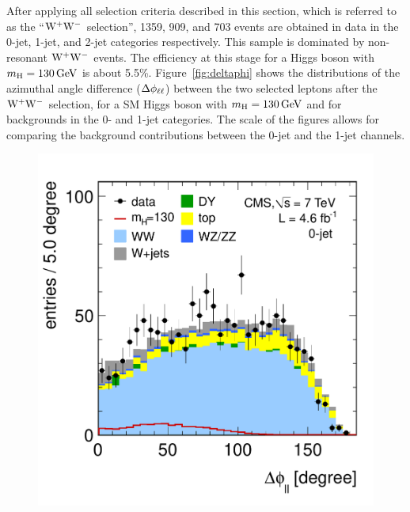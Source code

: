 \documentclass[12pt,twoside,a4paper,cmspaper,final,collab]{cms-tdr}
\begin{document}
After applying all selection criteria described in this section, which is referred to
as the ``$\mathrm{W^+}{}\mathrm{W^-}$ selection'', 1359, 909, and 703 events are obtained in data in the
0-jet, 1-jet, and 2-jet categories respectively. This sample is
dominated by non-resonant $\mathrm{W^+}{}\mathrm{W^-}$ events. The efficiency at this stage for a
Higgs boson with $m_{\mathrm{H}} =130\,\text{Ge\hspace{-.08em}V}$ is about 5.5\%.
Figure~\ref{fig:deltaphi} shows the distributions of the azimuthal angle
difference ($\Delta\phi_{\mathrm{\ell}\mathrm{\ell}}$) between the two selected leptons
after the $\mathrm{W^+}{}\mathrm{W^-}$ selection, for a SM Higgs boson with $m_{\mathrm{H}}=130\,\text{Ge\hspace{-.08em}V}$
and for backgrounds in the 0- and 1-jet categories. The scale of the figures
allows for comparing the background contributions between the 0-jet and the 1-jet channels.

\begin{figure}[htbp]
\begin{center}
  \includegraphics[width=\cmsFigWidth]{ww_0j_deltaphill}

\end{center}
\end{figure}
\end{document}

